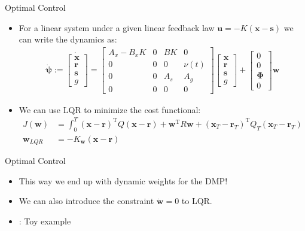 \documentclass[handout]{beamer}
\newcommand{\todo}{\color{red}{TODO}} %
\newcommand{\fullvec}{\boldsymbol{\psi}} %
\newcommand{\basis}{\mathbf{\Phi}} %
\newcommand{\state}{\mathbf{x}} %
\newcommand{\traj}{\mathbf{r}} %
\newcommand{\dmp}{\mathbf{s}} %
\newcommand{\sysInput}{\mathbf{u}} %
\newcommand{\weights}{\mathbf{w}} %
\begin{document}
\begin{frame}{Optimal Control}
\begin{itemize}
\item For a linear system under a given linear feedback law $\sysInput = -K(\state - \dmp)$ we can write the dynamics as:
\begin{equation*}
\begin{aligned}
 \dot{\fullvec} := \dot{
 \begin{bmatrix}
  \state \\
  \traj \\
  \dmp \\
  g
 \end{bmatrix}} = 
 \begin{bmatrix}
  A_x - B_xK & 0 & BK & 0 \\
  0 & 0 & 0 & \nu(t) \\
  0  & 0  & A_s & A_g  \\
  0 & 0 & 0 & 0
 \end{bmatrix}
 \begin{bmatrix}
   \state \\
   \traj \\
   \dmp \\
   g
  \end{bmatrix} +
  \begin{bmatrix}
    0 \\
    0 \\
    \basis \\
    0
   \end{bmatrix} \weights
\end{aligned}
\end{equation*}
\item We can use LQR to minimize the cost functional:
\begin{equation*}
\begin{aligned}
J(\weights) &= \int_{0}^{T} (\state - \traj)^{\mathrm{T}}Q(\state - \traj) + \weights^{\mathrm{T}}R\weights + (\state_T-\traj_T)^{\mathrm{T}}Q_{T}(\state_T-\traj_T) \\
\weights_{LQR} &= -K_{\weights}(\state - \traj)
\end{aligned}
\end{equation*}
\end{itemize}
\end{frame}
%
\begin{frame}{Optimal Control}
\begin{itemize}
\item This way we end up with dynamic weights for the DMP!
\item We can also introduce the constraint $\dot{\weights} = 0$ to LQR.
\item \todo: Toy example 
\end{itemize}
\end{frame}	
\end{document}
